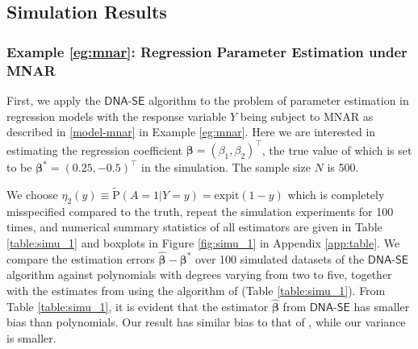 \documentclass{article}
\def\dnase{{\mathsf{DNA\mbox{-}SE}}}
\def\expit{\mathrm{expit}}
\theoremstyle{plain}
\theoremstyle{definition}
\theoremstyle{remark}
\def\P{\mathrm{P}}
\def\bbeta{\boldsymbol{\beta}}
\def\hat{\widehat}
\def\tilde{\widetilde}
\begin{document}
\subsection{Simulation Results}
\subsubsection{Example \ref{eg:mnar}: Regression Parameter Estimation under MNAR}
\label{sec:mnar}
First, we apply the $\dnase$ algorithm to the problem of  parameter estimation in regression models with the response variable $Y$ being subject to MNAR as described in \eqref{model-mnar} in Example \ref{eg:mnar}.  Here we are interested in estimating the regression coefficient $\bbeta = (\beta_{1}, \beta_{2})^{\top}$, the true value of which is set to be $\bbeta^{\ast} = (0.25, -0.5)^{\top}$ in the simulation. The sample size $N$ is 500.

We choose $\eta_{2} (y) \equiv \tilde{\P} (A = 1 | Y = y) = \expit (1 - y)$ which is completely misspecified compared to the truth, repeat the simulation experiments for 100 times, and numerical summary statistics of all estimators are given in Table \ref{table:simu_1} and boxplots in Figure \ref{fig:simu_1} in Appendix \ref{app:table}. We compare the estimation errors $\hat{\bbeta} - \bbeta^\ast$ over 100 simulated datasets of the $\dnase$ algorithm against polynomials with degrees varying from two to five, together with the estimates from \citet{zhao2022versatile} using the algorithm of \citet{atkinson1967numerical} (Table \ref{table:simu_1}). From Table \ref{table:simu_1}, it is evident that the estimator $\hat{\bbeta}$ from $\dnase$ has smaller bias than polynomials. Our result has similar bias to that of \citet{zhao2022versatile}, while our variance is smaller.
\end{document}
